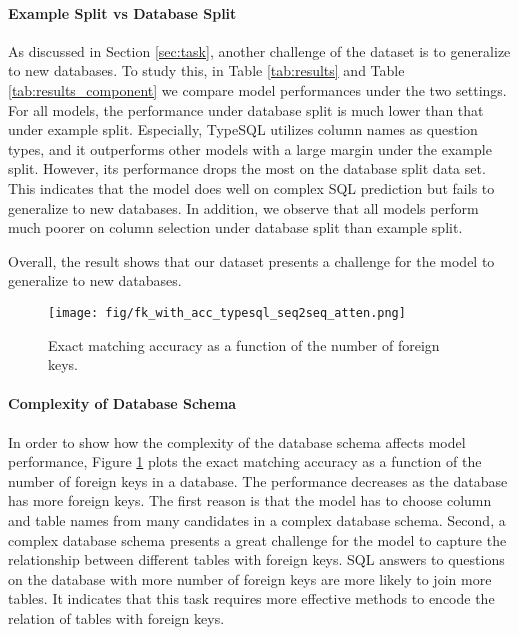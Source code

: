 \documentclass[11pt,a4paper]{article}
\begin{document}
\paragraph{Example Split vs Database Split}
As discussed in Section \ref{sec:task}, another challenge of the dataset is to generalize to new databases.
To study this, in Table \ref{tab:results} and Table \ref{tab:results_component} we compare model performances under the two settings.
For all models, the performance under database split is much lower than that under example split.
Especially, TypeSQL utilizes column names as question types, and it outperforms other models with a large margin under the example split. However, its performance drops the most on the database split data set. This indicates that the model does well on complex SQL prediction but fails to generalize to new databases.
In addition, we observe that all models perform much poorer on column selection under database split than example split. 

Overall, the result shows that our dataset presents a challenge for the model to generalize to new databases.

\begin{figure}[!t]
    \vspace{-1.5mm}\hspace{-1mm}
    \centering
    \texttt{[image: fig/fk\_with\_acc\_typesql\_seq2seq\_atten.png]}\vspace{-3mm}
    \caption{Exact matching accuracy as a function of the number of foreign keys.}
\label{fig:complexity}
\vspace{-4mm}
\end{figure}
\paragraph{Complexity of Database Schema}
In order to show how the complexity of the database schema affects model performance, Figure \ref{fig:complexity} plots the exact matching accuracy as a function of the number of foreign keys in a database. 
The performance decreases as the database has more foreign keys.
The first reason is that the model has to choose column and table names from many candidates in a complex database schema.
Second, a complex database schema presents a great challenge for the model to capture the relationship between different tables with foreign keys.
SQL answers to questions on the database with more number of foreign keys are more likely to join more tables.
It indicates that this task requires more effective methods to encode the relation of tables with foreign keys.
\end{document}
